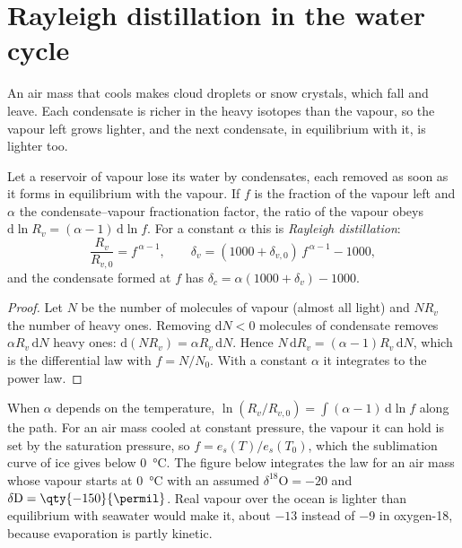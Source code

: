 \section{Rayleigh distillation in the water cycle}\label{sec:b3:stable-isotopes:rayleigh}

An air mass that cools makes cloud droplets or snow crystals, which fall and
leave. Each condensate is richer in the heavy isotopes than the vapour, so the
vapour left grows lighter, and the next condensate, in equilibrium with it, is
lighter too.

\begin{proposition}\label{prop:b3:stable-isotopes:rayleigh-distillation}
Let a reservoir of vapour lose its water by condensates, each removed as soon
as it forms in equilibrium with the vapour. If $f$ is the fraction of the
vapour left and $\alpha$ the condensate--vapour fractionation factor, the
ratio of the vapour obeys $\mathrm d\ln R_v = (\alpha - 1)\,\mathrm d\ln f$. For
a constant $\alpha$ this is \emph{Rayleigh
distillation}:
\[
\frac{R_v}{R_{v,0}} = f^{\,\alpha - 1}, \qquad
\delta_v = (1000 + \delta_{v,0})\,f^{\,\alpha - 1} - 1000,
\]
and the condensate formed at $f$ has $\delta_c = \alpha(1000 + \delta_v) - 1000$.
\end{proposition}

\begin{proof}
Let $N$ be the number of molecules of vapour (almost all light) and $N R_v$
the number of heavy ones. Removing $\mathrm dN < 0$ molecules of condensate
removes $\alpha R_v\,\mathrm dN$ heavy ones: $\mathrm d(NR_v) = \alpha
R_v\,\mathrm dN$. Hence $N\,\mathrm dR_v = (\alpha - 1)R_v\,\mathrm dN$, which is the
differential law with $f = N/N_0$. With a constant $\alpha$ it integrates to
the power law.
\end{proof}

When $\alpha$ depends on the temperature, $\ln(R_v/R_{v,0}) = \int(\alpha - 1)\,
\mathrm d\ln f$ along the path. For an air mass cooled at constant pressure,
the vapour it can hold is set by the saturation pressure, so $f =
e_s(T)/e_s(T_0)$, which the sublimation curve of ice gives below
\qty{0}{\celsius}. The figure below integrates the law for an air mass whose
vapour starts at \qty{0}{\celsius} with an assumed $\delta^{18}\mathrm O = -20$
and $\delta\mathrm D = \qty{-150}{\permil}$. Real vapour over the ocean is
lighter than equilibrium with seawater would make it, about $-13$ instead of
\qty{-9}{\permil} in oxygen-18, because evaporation is partly kinetic.

